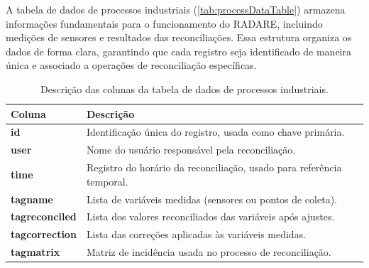 A tabela de dados de processos industriais (\autoref{tab:processDataTable}) armazena informações fundamentais para o funcionamento do RADARE, incluindo medições de sensores e resultados das reconciliações. Essa estrutura organiza os dados de forma clara, garantindo que cada registro seja identificado de maneira única e associado a operações de reconciliação específicas.

\begin{table}[htbp!]
    \centering
    \label{tab:processDataTable}
    \begin{tabular}{|l|p{10cm}|}
        \hline
        \textbf{Coluna} & \textbf{Descrição} \\ \hline
        \textbf{id} & Identificação única do registro, usada como chave primária. \\ \hline
        \textbf{user} & Nome do usuário responsável pela reconciliação. \\ \hline
        \textbf{time} & Registro do horário da reconciliação, usado para referência temporal. \\ \hline
        \textbf{tagname} & Lista de variáveis medidas (sensores ou pontos de coleta). \\ \hline
        \textbf{tagreconciled} & Lista dos valores reconciliados das variáveis após ajustes. \\ \hline
        \textbf{tagcorrection} & Lista das correções aplicadas às variáveis medidas. \\ \hline
        \textbf{tagmatrix} & Matriz de incidência usada no processo de reconciliação. \\ \hline
    \end{tabular}
    \caption{Descrição das colunas da tabela de dados de processos industriais.}
\end{table}
